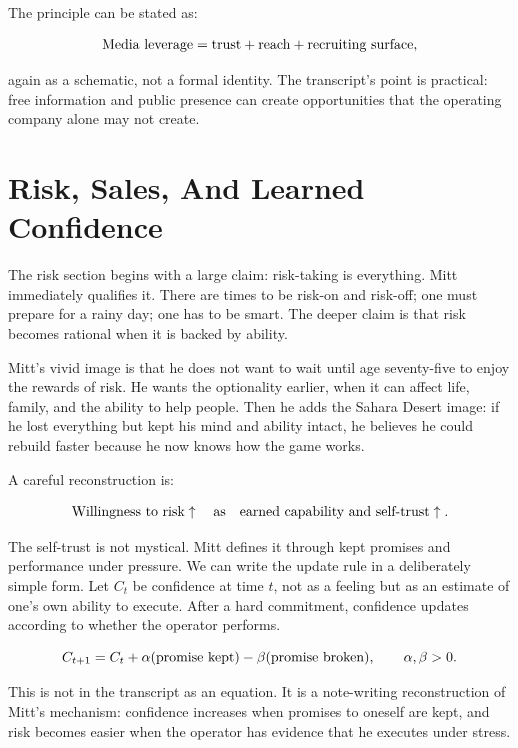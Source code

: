 The principle can be stated as:

\begin{equation}
  \hbox{Media leverage}
  =
  \hbox{trust}+\hbox{reach}+\hbox{recruiting surface},
\end{equation}

again as a schematic, not a formal identity. The transcript's point is practical: free information and public presence can create opportunities that the operating company alone may not create.

\section{Risk, Sales, And Learned Confidence}

The risk section begins with a large claim: risk-taking is everything. Mitt immediately qualifies it. There are times to be risk-on and risk-off; one must prepare for a rainy day; one has to be smart. The deeper claim is that risk becomes rational when it is backed by ability.

Mitt's vivid image is that he does not want to wait until age seventy-five to enjoy the rewards of risk. He wants the optionality earlier, when it can affect life, family, and the ability to help people. Then he adds the Sahara Desert image: if he lost everything but kept his mind and ability intact, he believes he could rebuild faster because he now knows how the game works.

A careful reconstruction is:

\begin{equation}
  \hbox{Willingness to risk}
  \uparrow
  \quad \hbox{as} \quad
  \hbox{earned capability and self-trust} \uparrow.
\end{equation}

The self-trust is not mystical. Mitt defines it through kept promises and performance under pressure. We can write the update rule in a deliberately simple form. Let \(C_t\) be confidence at time \(t\), not as a feeling but as an estimate of one's own ability to execute. After a hard commitment, confidence updates according to whether the operator performs.

\begin{equation}
  C_{t+1}
  =
  C_t
  +
  \alpha(\hbox{promise kept})
  -
  \beta(\hbox{promise broken}),
  \qquad
  \alpha,\beta>0.
\end{equation}

This is not in the transcript as an equation. It is a note-writing reconstruction of Mitt's mechanism: confidence increases when promises to oneself are kept, and risk becomes easier when the operator has evidence that he executes under stress.

